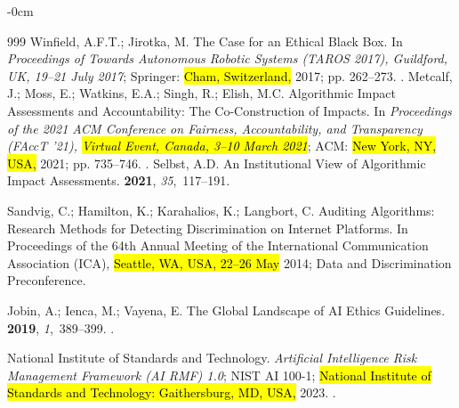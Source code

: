 \documentclass[mca,article,accept,pdftex,oneauthor]{Definitions/mdpi}
\begin{document}
\begin{adjustwidth}{-\extralength}{0cm}
\begin{thebibliography}{999}
Winfield, A.F.T.; Jirotka, M.
\newblock The Case for an Ethical Black Box.
\newblock In \emph{Proceedings of Towards Autonomous Robotic Systems (TAROS 2017), Guildford, UK, 19--21 July 2017}; Springer: \hl{Cham, Switzerland,} 2017; pp. 262--273.
.
Metcalf, J.; Moss, E.; Watkins, E.A.; Singh, R.; Elish, M.C.
\newblock Algorithmic Impact Assessments and Accountability: The
  Co-Construction of Impacts.
\newblock In \emph{Proceedings of the 2021 ACM Conference on Fairness,
  Accountability, and Transparency (FAccT '21), \hl{Virtual Event, Canada, 3--10 March 2021}}; ACM: \hl{New York, NY, USA,} 2021; pp. 735--746.
.
Selbst, A.D.
\newblock An Institutional View of Algorithmic Impact Assessments.
 {\bf 2021}, {\em
  35},~117--191.

Sandvig, C.; Hamilton, K.; Karahalios, K.; Langbort, C.
\newblock Auditing Algorithms: Research Methods for Detecting Discrimination on
  Internet Platforms.
\newblock In Proceedings of the 64th Annual Meeting of the International
  Communication Association (ICA), \hl{Seattle, WA, USA, 22--26 May} 2014;
\newblock Data and Discrimination Preconference.

Jobin, A.; Ienca, M.; Vayena, E.
\newblock The Global Landscape of {AI} Ethics Guidelines.
 {\bf 2019}, {\em 1},~389--399.
.

{National Institute of Standards and Technology}.
\newblock \emph{Artificial Intelligence Risk Management Framework ({AI RMF}) 1.0};
\newblock NIST AI 100-1; \hl{National Institute of Standards and Technology: Gaithersburg, MD, USA,} 2023.
.


\end{thebibliography}
\end{adjustwidth}
\end{document}
